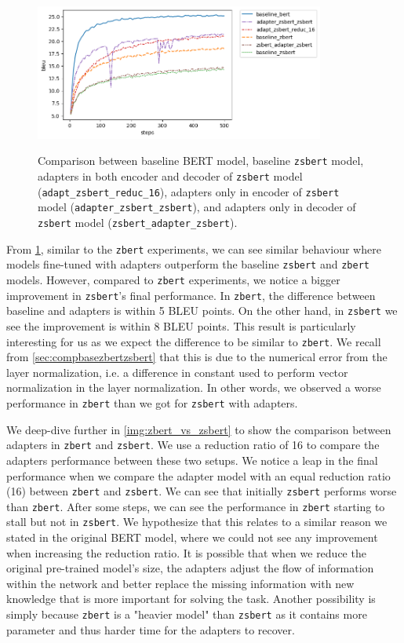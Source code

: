 \begin{figure}[h]
    {\includegraphics[width=0.85\textwidth]{img/zsbert_pos.png}}
    \centering
    \caption[Comparison between baseline BERT and \texttt{zsbert} models.]{Comparison between baseline BERT model, baseline \texttt{zsbert} model, adapters in both encoder and decoder of \texttt{zsbert} model (\texttt{adapt\_zsbert\_reduc\_16}), adapters only in encoder of \texttt{zsbert} model (\texttt{adapter\_zsbert\_zsbert}), and adapters only in decoder of \texttt{zsbert} model (\texttt{zsbert\_adapter\_zsbert}).}
    \label{img:zsbert_pos}
\end{figure}

From \cref{img:zsbert_pos}, similar to the \texttt{zbert} experiments, we can see similar behaviour where models fine-tuned with adapters outperform the baseline \texttt{zsbert} and \texttt{zbert} models. However, compared to \texttt{zbert} experiments, we notice a bigger improvement in \texttt{zsbert}'s final performance. In \texttt{zbert}, the difference between baseline and adapters is within 5 BLEU points. On the other hand, in \texttt{zsbert} we see the improvement is within 8 BLEU points. This result is particularly interesting for us as we expect the difference to be similar to \texttt{zbert}. We recall from \ref{sec:compbasezbertzsbert} that this is due to the numerical error from the layer normalization, i.e. a difference in constant used to perform vector normalization in the layer normalization. In other words, we observed a worse performance in \texttt{zbert} than we got for \texttt{zsbert} with adapters.

We deep-dive further in \cref{img:zbert_vs_zsbert} to show the comparison between adapters in \texttt{zbert} and \texttt{zsbert}. We use a reduction ratio of 16 to compare the adapters performance between these two setups. We notice a leap in the final performance when we compare the adapter model with an equal reduction ratio (16) between \texttt{zbert} and \texttt{zsbert}. We can see that initially \texttt{zsbert} performs worse than \texttt{zbert}. After some steps, we can see the performance in \texttt{zbert} starting to stall but not in \texttt{zsbert}. We hypothesize that this relates to a similar reason we stated in the original BERT model, where we could not see any improvement when increasing the reduction ratio. It is possible that when we reduce the original pre-trained model's size, the adapters adjust the flow of information within the network and better replace the missing information with new knowledge that is more important for solving the task. Another possibility is simply because \texttt{zbert} is a "heavier model" than \texttt{zsbert} as it contains more parameter and thus harder time for the adapters to recover.


